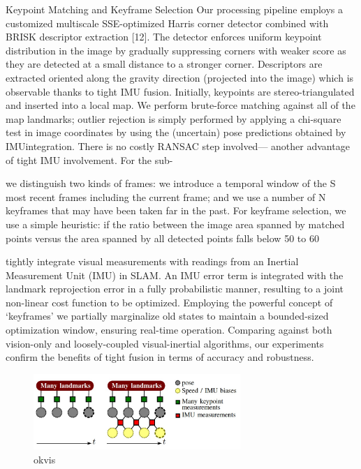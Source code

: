 \documentclass[12pt,twoside]{article}
\begin{document}
Keypoint Matching and Keyframe Selection
Our processing pipeline employs a customized multiscale
SSE-optimized Harris corner detector combined with
BRISK descriptor extraction [12]. The detector enforces
uniform keypoint distribution in the image by gradually
suppressing corners with weaker score as they are detected
at a small distance to a stronger corner. Descriptors are
extracted oriented along the gravity direction (projected into
the image) which is observable thanks to tight IMU fusion.
Initially, keypoints are stereo-triangulated and inserted
into a local map. We perform brute-force matching against
all of the map landmarks; outlier rejection is simply performed
by applying a chi-square test in image coordinates
by using the (uncertain) pose predictions obtained by IMUintegration.
There is no costly RANSAC step involved—
another advantage of tight IMU involvement. For the sub-


we distinguish two
kinds of frames: we introduce a temporal window of the S
most recent frames including the current frame; and we use a
number of N keyframes that may have been taken far in the
past. For keyframe selection, we use a simple heuristic: if
the ratio between the image area spanned by matched points
versus the area spanned by all detected points falls below
50 to 60%


tightly integrate visual measurements with readings from an
Inertial Measurement Unit (IMU) in SLAM. An IMU error
term is integrated with the landmark reprojection error in a
fully probabilistic manner, resulting to a joint non-linear cost
function to be optimized. Employing the powerful concept of
‘keyframes’ we partially marginalize old states to maintain a
bounded-sized optimization window, ensuring real-time operation.
Comparing against both vision-only and loosely-coupled
visual-inertial algorithms, our experiments confirm the benefits
of tight fusion in terms of accuracy and robustness.


\begin{figure}[h]
    \centering
    \includegraphics[width=0.7\textwidth]{figures/okvis}
    \caption{okvis\cite{leutenegger2015keyframe}}
    \label{fig:kinec}
\end{figure}
\end{document}
